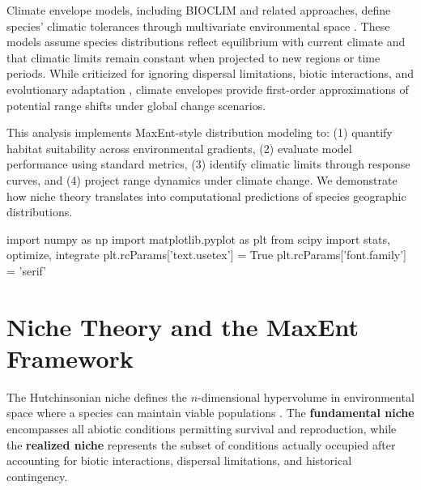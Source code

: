 \documentclass[11pt,a4paper]{article}
\begin{document}
Climate envelope models, including BIOCLIM and related approaches, define species' climatic tolerances through multivariate environmental space \cite{booth2014bioclim}. These models assume species distributions reflect equilibrium with current climate and that climatic limits remain constant when projected to new regions or time periods. While criticized for ignoring dispersal limitations, biotic interactions, and evolutionary adaptation \cite{araujo2005validation}, climate envelopes provide first-order approximations of potential range shifts under global change scenarios.

This analysis implements MaxEnt-style distribution modeling to: (1) quantify habitat suitability across environmental gradients, (2) evaluate model performance using standard metrics, (3) identify climatic limits through response curves, and (4) project range dynamics under climate change. We demonstrate how niche theory translates into computational predictions of species geographic distributions.

\begin{pycode}

import numpy as np
import matplotlib.pyplot as plt
from scipy import stats, optimize, integrate
plt.rcParams['text.usetex'] = True
plt.rcParams['font.family'] = 'serif'

\end{pycode}

\section{Niche Theory and the MaxEnt Framework}

The Hutchinsonian niche defines the $n$-dimensional hypervolume in environmental space where a species can maintain viable populations \cite{hutchinson1957concluding}. The \textbf{fundamental niche} encompasses all abiotic conditions permitting survival and reproduction, while the \textbf{realized niche} represents the subset of conditions actually occupied after accounting for biotic interactions, dispersal limitations, and historical contingency.
\end{document}
